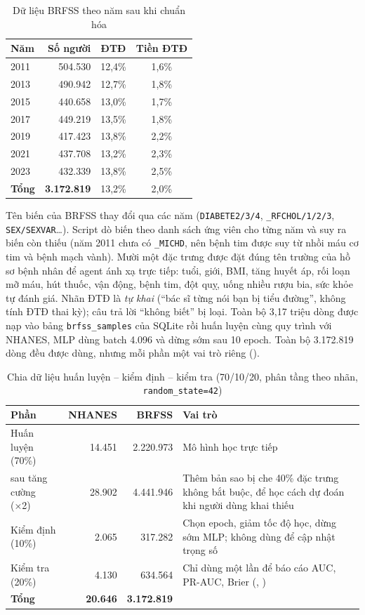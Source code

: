 \begin{table}[H]
\centering
\caption{Dữ liệu BRFSS theo năm sau khi chuẩn hóa}
\label{tab:brfss-years}
\small
\begin{tabular}{@{}lrcc@{}}
\toprule
\textbf{Năm} & \textbf{Số người} & \textbf{ĐTĐ} & \textbf{Tiền ĐTĐ} \\
\midrule
2011 & 504.530 & 12,4\% & 1,6\% \\
2013 & 490.942 & 12,7\% & 1,8\% \\
2015 & 440.658 & 13,0\% & 1,7\% \\
2017 & 449.219 & 13,5\% & 1,8\% \\
2019 & 417.423 & 13,8\% & 2,2\% \\
2021 & 437.708 & 13,2\% & 2,3\% \\
2023 & 432.339 & 13,8\% & 2,5\% \\
\midrule
\textbf{Tổng} & \textbf{3.172.819} & 13,2\% & 2,0\% \\
\bottomrule
\end{tabular}
\end{table}

Tên biến của BRFSS thay đổi qua các năm (\texttt{DIABETE2/3/4}, \texttt{\_RFCHOL/1/2/3}, \texttt{SEX/SEXVAR}\ldots). Script dò biến theo danh sách ứng viên cho từng năm và suy ra biến còn thiếu (năm 2011 chưa có \texttt{\_MICHD}, nên bệnh tim được suy từ nhồi máu cơ tim và bệnh mạch vành). Mười một đặc trưng được đặt đúng tên trường của hồ sơ bệnh nhân để agent ánh xạ trực tiếp: tuổi, giới, BMI, tăng huyết áp, rối loạn mỡ máu, hút thuốc, vận động, bệnh tim, đột quỵ, uống nhiều rượu bia, sức khỏe tự đánh giá. Nhãn ĐTĐ là \emph{tự khai} (``bác sĩ từng nói bạn bị tiểu đường'', không tính ĐTĐ thai kỳ); câu trả lời ``không biết'' bị loại. Toàn bộ 3,17 triệu dòng được nạp vào bảng \texttt{brfss\_samples} của SQLite rồi huấn luyện cùng quy trình với NHANES, MLP dùng batch 4.096 và dừng sớm sau 10 epoch. Toàn bộ 3.172.819 dòng đều được dùng, nhưng mỗi phần một vai trò riêng ().

\begin{table}[H]
\centering
\caption{Chia dữ liệu huấn luyện – kiểm định – kiểm tra (70/10/20, phân tầng theo nhãn, \texttt{random\_state=42})}
\label{tab:split}
\small
\begin{tabularx}{\linewidth}{@{}L{3.3cm}rrY@{}}
\toprule
\textbf{Phần} & \textbf{NHANES} & \textbf{BRFSS} & \textbf{Vai trò} \\
\midrule
Huấn luyện (70\%) & 14.451 & 2.220.973 & Mô hình học trực tiếp \\
\quad sau tăng cường (×2) & 28.902 & 4.441.946 & Thêm bản sao bị che 40\% đặc trưng không bắt buộc, để học cách dự đoán khi người dùng khai thiếu \\
Kiểm định (10\%) & 2.065 & 317.282 & Chọn epoch, giảm tốc độ học, dừng sớm MLP; không dùng để cập nhật trọng số \\
Kiểm tra (20\%) & 4.130 & 634.564 & Chỉ dùng một lần để báo cáo AUC, PR-AUC, Brier (, ) \\
\midrule
\textbf{Tổng} & \textbf{20.646} & \textbf{3.172.819} & \\
\bottomrule
\end{tabularx}
\end{table}

